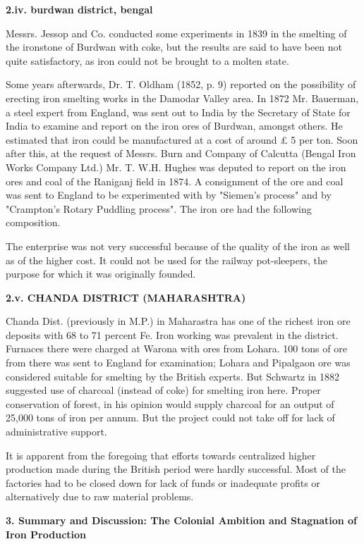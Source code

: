 \textbf{2.}\textbf{iv}\textbf{. burdwan district, bengal}

Messrs. Jessop and Co. conducted some experiments in 1839 in the smelting of the ironstone of Burdwan with coke, but the results are said to have been not quite satisfactory, as iron could not be brought to a molten state.

Some years afterwards, Dr. T. Oldham (1852, p. 9) reported on the possibility of erecting iron smelting works in the Damodar Valley area. In 1872 Mr. Bauerman, a steel expert from England, was sent out to India by the Secretary of State for India to examine and report on the iron ores of Burdwan, amongst others. He estimated that iron could be manufactured at a cost of around £ 5 per ton. Soon after this, at the request of Messrs. Burn and Company of Calcutta (Bengal Iron Works Company Ltd.) Mr. T. W.H. Hughes was deputed to report on the iron ores and coal of the Raniganj field in 1874. A consignment of the ore and coal was sent to England to be experimented with by "Siemen's process" and by "Crampton's Rotary Puddling process". The iron ore had the following composition.

The enterprise was not very successful because of the quality of the iron as well as of the higher cost. It could not be used for the railway pot-sleepers, the purpose for which it was originally founded.

\textbf{2.v. CHANDA DISTRICT (MAHARASHTRA)}

Chanda Dist. (previously in M.P.) in Maharastra has one of the richest iron ore deposits with 68 to 71 percent Fe. Iron working was prevalent in the district. Furnaces there were charged at Warona with ores from Lohara. 100 tons of ore from there was sent to England for examination; Lohara and Pipalgaon ore was considered suitable for smelting by the British experts. But Schwartz in 1882 suggested use of charcoal (instead of coke) for smelting iron here. Proper conservation of forest, in his opinion would supply charcoal for an output of 25,000 tons of iron per annum. But the project could not take off for lack of administrative support.

It is apparent from the foregoing that efforts towards centralized higher production made during the British period were hardly successful. Most of the factories had to be closed down for lack of funds or inadequate profits or alternatively due to raw material problems.

\textbf{3. Summary and Discussion: The Colonial Ambition and Stagnation of Iron Production}

